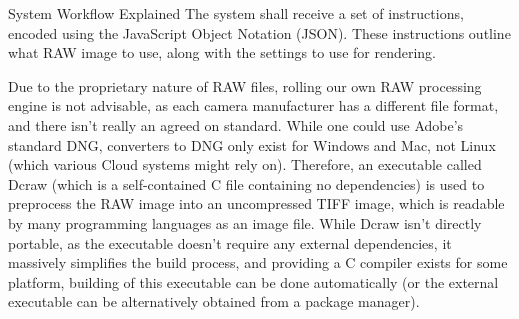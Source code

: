 \documentclass[final]{beamer}
\begin{document}
\begin{frame}{}
\begin{columns}[t]
\begin{column}{.48\linewidth}
\begin{block}{System Workflow Explained}
          The system shall receive a set of instructions, encoded using the JavaScript
          Object Notation (JSON). These instructions outline what RAW image to use, along with
          the settings to use for rendering.

          Due to the proprietary nature of RAW files, rolling our own RAW processing engine is not
          advisable, as each camera manufacturer has a different file format, and there isn't really
          an agreed on standard. While one could use Adobe's standard DNG, converters to DNG only exist
          for Windows and Mac, not Linux (which various Cloud systems might rely on). Therefore, an
          executable called Dcraw (which is a self-contained C file containing no dependencies) is used
          to preprocess the RAW image into an uncompressed TIFF image, which is readable by many programming
          languages as an image file. While Dcraw isn't directly portable, as the executable doesn't require
          any external dependencies, it massively simplifies the build process, and providing a C compiler exists
          for some platform, building of this executable can be done automatically (or the external executable can be
          alternatively obtained from a package manager). 

        \end{block}

      \end{column}
    \end{columns}


  \end{frame}
\end{document}
